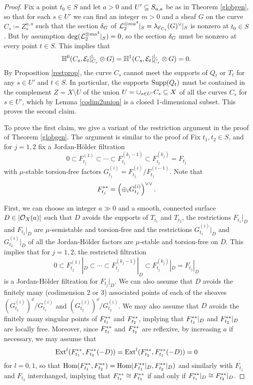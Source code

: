 \begin{proof}
Fix a point $t_0 \in S$ and let $a > 0$ and $U' \subseteq S_{a,a}$ be as in Theorem \ref{globgen}, so that for each $s \in U'$ we can find an integer $m > 0$ and a sheaf $G$ on the curve $C_s \coloneqq Z^{a,a}_s$ such that the section $\delta_G$ of $\mathcal{L}_2^{\otimes m a^4}|_S = \lambda_{\mathcal{E}_{C_s}}(G)^\vee|_S$ is nonzero at $t_0 \in S$. But by assumption $\deg(\mathcal{L}_2^{\otimes m a^4}|_S) = 0$, so the section $\delta_G$ must be nonzero at every point $t \in S$. This implies that
\[ \mathbb{H}^0(C_s, \mathcal{E}_t|^{\mathbb{L}}_{C_s} \otimes G) = \mathbb{H}^1(C_s, \mathcal{E}_t|^{\mathbb{L}}_{C_s} \otimes G) = 0. \]
By Proposition \ref{restprop}, the curve $C_s$ cannot meet the supports of $Q_t$ or $T_t$ for any $s \in U'$ and $t \in S$. In particular, the supports $\operatorname{\mathrm{Supp}}(Q_t)$ must be contained in the complement $Z = X \setminus U$ of the union $U = \cup_{s \in U'} C_s \subseteq X$ of all the curves $C_s$ for $s \in U'$, which by Lemma \ref{codim2union} is a closed 1-dimensional subset. This proves the second claim.

To prove the first claim, we give a variant of the restriction argument in the proof of Theorem \ref{globgen}. The argument is similar to the proof of \cite[Lemma 8.2.12]{HL} Fix $t_1, t_2 \in S$, and for $j = 1, 2$ fix a Jordan-H\"older filtration
\[ 0 \subset F_{t_j}^{(1)} \subset \cdots \subset F_{t_j}^{(k_j-1)} \subset F_{t_j}^{(k_j)} = F_{t_j} \]
with $\mu$-stable torsion-free factors $G_{t_j}^{(i)} = F_{t_j}^{(i)}/F_{t_j}^{(i-1)}$. Note that 
\[ F_{t_j}^{\ast\ast} = \left(\oplus_i G_{t_j}^{(i)}\right)^{\vee\vee}. \]

First, we can choose an integer $a \gg 0$ and a smooth, connected surface $D \in |\mathcal{O}_X(a)|$ such that $D$ avoids the supports of $T_{t_1}$ and $T_{t_2}$, the restrictions $F_{t_1}|_D$ and $F_{t_2}|_D$ are $\mu$-semistable and torsion-free \cite[Theorem 7.1.1]{HL} and the restrictions $G_{t_1}^{(i)}|_D$ and $G_{t_2}^{(i)}|_D$ of all the Jordan-H\"older factors are $\mu$-stable and torsion-free \cite[Theorem 7.2.8]{HL} on $D$. This implies that for $j = 1, 2$, the restricted filtration
\[ 0 \subset F_{t_j}^{(1)}|_D \subset \cdots \subset F_{t_j}^{(k_j-1)}|_D \subset F_{t_j}^{(k_j)}|_D = F_{t_j}|_D \]
is a Jordan-H\"older filtration for $F_{t_j}|_D$. We can also assume that $D$ avoids the finitely many (codimension 2 or 3) associated points of each of the sheaves $(G_{t_1}^{(i)})^\dd/G_{t_1}^{(i)}$ and $(G_{t_2}^{(i)})^\dd/G_{t_2}^{(i)}$. We may also assume that $D$ avoids the finitely many singular points of $F_{t_1}^{\ast\ast}$ and $F_{t_2}^{\ast\ast}$, implying that $F_{t_1}^{\ast\ast}|_D$ and $F_{t_2}^{\ast\ast}|_D$ are locally free. Moreover, since $F_{t_1}^{\ast\ast}$ and $F_{t_2}^{\ast\ast}$ are reflexive, by increasing $a$ if necessary, we may assume that 
\[ \mathrm{Ext}^l(F_{t_1}^{\ast\ast}, F_{t_2}^{\ast\ast}(-D)) = \mathrm{Ext}^l(F_{t_2}^{\ast\ast}, F_{t_1}^{\ast\ast}(-D)) = 0 \]
for $l = 0, 1$, so that $\mathrm{Hom}(F_{t_1}^{\ast\ast}, F_{t_2}^{\ast\ast}) = \mathrm{Hom}(F_{t_1}^{\ast\ast}|_D, F_{t_2}^{\ast\ast}|_D)$ and similarly with $F_{t_1}$ and $F_{t_2}$ interchanged, implying that $F_{t_1}^{\ast\ast} \cong F_{t_2}^{\ast\ast}$ if and only if $F_{t_1}^{\ast\ast}|_D \cong F_{t_2}^{\ast\ast}|_D$.


\end{proof}
